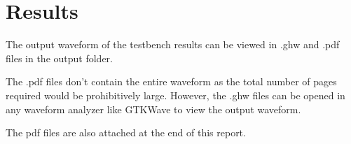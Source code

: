 \documentclass[a4paper]{scrartcl}
\renewcommand{\tt}{\texttt}
\begin{document}
\section{Results}
The output waveform of the testbench results can be viewed in .ghw and .pdf files in the output folder.

The .pdf files don't contain the entire waveform as the total number of pages required would be prohibitively large. However, the .ghw files can be opened in any waveform analyzer like GTKWave to view the output waveform.

The pdf files are also attached at the end of this report.





\end{document}
